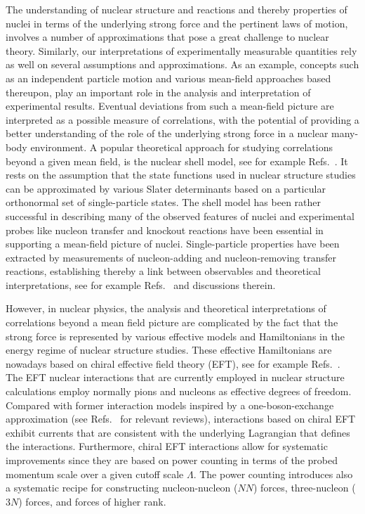 \documentclass[preprint,12pt,authoryear]{elsarticle}
\begin{document}
The understanding of nuclear structure and reactions and thereby
properties of nuclei in terms of the underlying strong force and the
pertinent laws of motion, involves a number of approximations that
pose a great challenge to nuclear theory.  Similarly, our interpretations of
experimentally measurable quantities rely as well on several assumptions and
approximations.  As an example, concepts such as an independent
particle motion and various mean-field approaches based thereupon,
play an important role in the analysis and interpretation of
experimental results. Eventual deviations from such a mean-field
picture are interpreted as a possible measure of correlations, with
the potential of providing a better understanding of the role of the
underlying strong force in a nuclear many-body environment.  A popular
theoretical approach for studying correlations beyond a given mean field, is
the nuclear shell model, see for example
Refs.~\cite{lawson1980,talmi1993,caurier2005}. It rests on the assumption that the
state functions used in nuclear structure studies can be approximated
by various Slater determinants based on a particular orthonormal set of
single-particle states. The shell model has been rather successful in
describing many of the observed features of nuclei and experimental
probes like nucleon transfer and knockout reactions have been
essential in supporting a mean-field picture of
nuclei. Single-particle properties have been extracted by measurements
of nucleon-adding and nucleon-removing transfer reactions,
establishing thereby a link between observables and theoretical
interpretations, see for example
Refs.~\cite{schiffer2012,schiffer2013} and discussions therein. 


However, in nuclear physics, the analysis and theoretical
interpretations of correlations beyond a mean field picture are
complicated by the fact that the strong force is represented by
various effective models and Hamiltonians in the energy regime of
nuclear structure studies. These effective Hamiltonians are nowadays
based on  chiral effective field theory
(EFT),  see for example
Refs.~\cite{weinberg1990,weinberg1991,ordonez1992,ordonez1994,ordonez1996,vankolck1999,machleidt2011,epelbaum2009,ekstrom2013}.  
The EFT nuclear interactions that are currently
employed in nuclear structure calculations employ normally pions and nucleons
as effective degrees of freedom. Compared
with former interaction models inspired by a one-boson-exchange
approximation (see Refs.~\cite{machleidt1989,machleidt2001} for
relevant reviews), interactions based on chiral EFT exhibit currents
that are consistent with the underlying Lagrangian that defines the
interactions. Furthermore, chiral EFT interactions allow for systematic
improvements since they are based on power counting in terms of the
probed momentum scale over a given cutoff scale $\Lambda$.  The power counting
introduces also a systematic recipe for constructing nucleon-nucleon
($NN$) forces, three-nucleon ($3N$) forces, and forces of higher rank.
\end{document}
